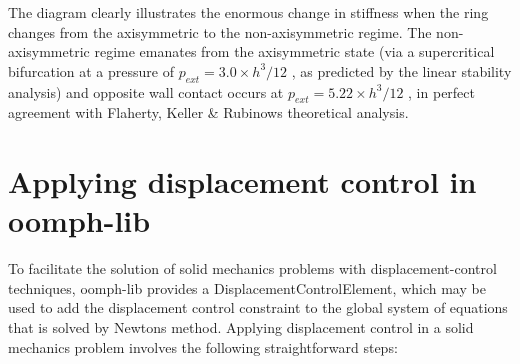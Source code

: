 The diagram clearly illustrates the enormous change in stiffness when the ring changes from the axisymmetric to the non-\/axisymmetric regime. The non-\/axisymmetric regime emanates from the axisymmetric state (via a supercritical bifurcation at a pressure of $ p_{ext} = 3.0 \times h^3/12 $ , as predicted by the linear stability analysis) and opposite wall contact occurs at $ p_{ext} = 5.22 \times h^3/12 $ , in perfect agreement with Flaherty, Keller \& Rubinow\textquotesingle{}s theoretical analysis.



\hypertarget{index_displ_control}{}\section{Applying displacement control in oomph-\/lib}\label{index_displ_control}
To facilitate the solution of solid mechanics problems with displacement-\/control techniques, {\ttfamily oomph-\/lib} provides a {\ttfamily Displacement\+Control\+Element}, which may be used to add the displacement control constraint to the global system of equations that is solved by Newton\textquotesingle{}s method. Applying displacement control in a solid mechanics problem involves the following straightforward steps\+:
